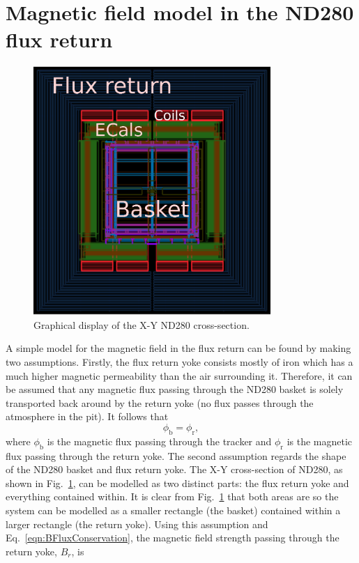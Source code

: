 \section{Magnetic field model in the ND280 flux return}
\label{sec:MagneticFieldModel}
\begin{figure}
  \centering
  \includegraphics[width=9cm]{images/magnetic_field/ND280FluxReturn}
  \caption{Graphical display of the X-Y ND280 cross-section.}
  \label{fig:ND280FluxReturn}
\end{figure}
A simple model for the magnetic field in the flux return can be found by making two assumptions.  Firstly, the flux return yoke consists mostly of iron which has a much higher magnetic permeability than the air surrounding it.  Therefore, it can be assumed that any magnetic flux passing through the ND280 basket is solely transported back around by the return yoke (no flux passes through the atmosphere in the pit).  It follows that
\begin{equation}
  \phi_{\textrm{b}} = \phi_{\textrm{r}},
  \label{eqn:BFluxConservation}
\end{equation}
where $\phi_{\textrm{b}}$ is the magnetic flux passing through the tracker and $\phi_{\textrm{r}}$ is the magnetic flux passing through the return yoke.  The second assumption regards the shape of the ND280 basket and flux return yoke.  The X-Y cross-section of ND280, as shown in Fig.~\ref{fig:ND280FluxReturn}, can be modelled as two distinct parts: the flux return yoke and everything contained within.  It is clear from Fig.~\ref{fig:ND280FluxReturn} that both areas are  so the system can be modelled as a smaller rectangle (the basket) contained within a larger rectangle (the return yoke).  Using this assumption and Eq.~\ref{eqn:BFluxConservation}, the magnetic field strength passing through the return yoke, $B_{r}$, is
